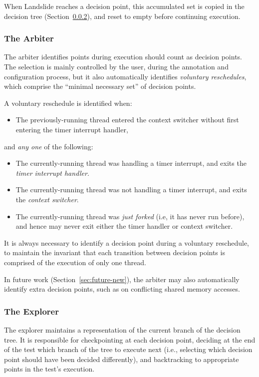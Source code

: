 When Landslide reaches a decision point, this accumulated set is copied in the decision tree (Section~\ref{sec:components-explore}), and reset to empty before continuing execution.

\subsubsection{The Arbiter}
\label{sec:components-arbiter}

The arbiter identifies points during execution should count as decision points. The selection is mainly controlled by the user, during the annotation and configuration process, but it also automatically identifies {\em voluntary reschedules}, which comprise the ``minimal necessary set'' of decision points.

A voluntary reschedule is identified when:
\begin{itemize}
	\item The previously-running thread entered the context switcher without first entering the timer interrupt handler,
\end{itemize}

and {\em any one} of the following:
\begin{itemize}
	\item The currently-running thread was handling a timer interrupt, and exits the {\em timer interrupt handler}.
	\item The currently-running thread was not handling a timer interrupt, and exits the {\em context switcher}.
	\item The currently-running thread was {\em just forked} (i.e, it has never run before), and hence may never exit either the timer handler or context switcher.
\end{itemize}

It is always necessary to identify a decision point during a voluntary reschedule, to maintain the invariant that each transition between decision points is comprised of the execution of only one thread.

In future work (Section~\ref{sec:future-new}), the arbiter may also automatically identify extra decision points, such as on conflicting shared memory accesses.

\subsubsection{The Explorer}
\label{sec:components-explore}

The explorer maintains a representation of the current branch of the decision tree. It is responsible for checkpointing at each decision point, deciding at the end of the test which branch of the tree to execute next (i.e., selecting which decision point should have been decided differently), and backtracking to appropriate points in the test's execution.


